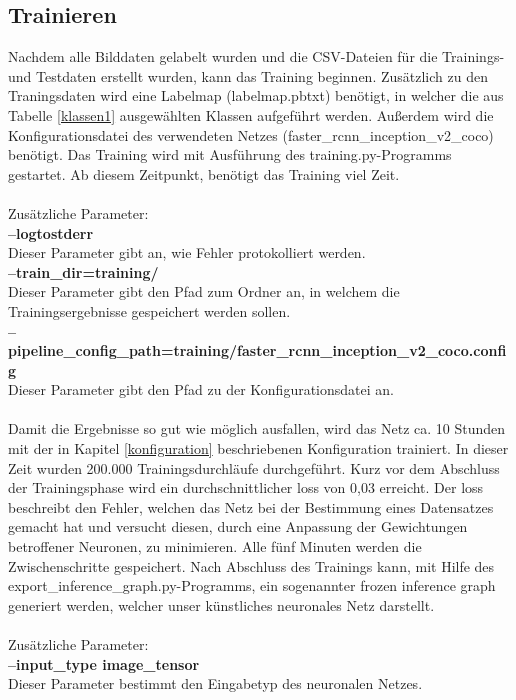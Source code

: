 \documentclass[a4paper,12pt,oneside]{article}
\begin{document}
\subsection{Trainieren}
Nachdem alle Bilddaten gelabelt wurden und die CSV-Dateien für die Trainings- und Testdaten erstellt wurden, kann das Training beginnen. Zusätzlich zu den Traningsdaten wird eine Labelmap (labelmap.pbtxt) benötigt, in welcher die aus Tabelle \ref{klassen1} ausgewählten Klassen aufgeführt werden. Außerdem wird die Konfigurationsdatei des verwendeten Netzes (faster\_rcnn\_inception\_v2\_coco) benötigt. Das Training wird mit Ausführung des training.py-Programms gestartet. Ab diesem Zeitpunkt, benötigt das Training viel Zeit.\\\\
Zusätzliche Parameter: \\
\textbf{--logtostderr}\\
Dieser Parameter gibt an, wie Fehler protokolliert werden.\\
\textbf{--train\_dir=training/}\\
Dieser Parameter gibt den Pfad zum Ordner an, in welchem die Trainingsergebnisse gespeichert werden sollen.\\
\textbf{--pipeline\_config\_path=training/faster\_rcnn\_inception\_v2\_coco.config}\\
Dieser Parameter gibt den Pfad zu der Konfigurationsdatei an.\\\\
Damit die Ergebnisse so gut wie möglich ausfallen, wird das Netz ca. 10 Stunden mit der in Kapitel \ref{konfiguration} beschriebenen Konfiguration trainiert. In dieser Zeit wurden 200.000 Trainingsdurchläufe durchgeführt. Kurz vor dem Abschluss der Trainingsphase wird ein durchschnittlicher \glqq loss\grqq{} von 0,03 erreicht. Der \glqq loss\grqq{} beschreibt den Fehler, welchen das Netz bei der Bestimmung eines Datensatzes gemacht hat und versucht diesen, durch eine Anpassung der Gewichtungen betroffener Neuronen, zu minimieren. Alle fünf Minuten werden die Zwischenschritte gespeichert. Nach Abschluss des Trainings kann, mit Hilfe des export\_inference\_graph.py-Programms, ein sogenannter \glqq frozen inference graph\grqq{} generiert werden, welcher unser künstliches neuronales Netz darstellt.\\\\
Zusätzliche Parameter:\\
\textbf{--input\_type image\_tensor}\\
Dieser Parameter bestimmt den Eingabetyp des neuronalen Netzes.\\
\end{document}
